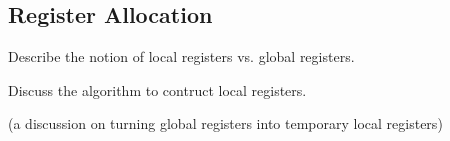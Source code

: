 \subsection{Register Allocation}
\label{sec:reg_alloc}

Describe the notion of local registers vs. global registers.

Discuss the algorithm to contruct local registers.

(a discussion on turning global registers into temporary local registers)
